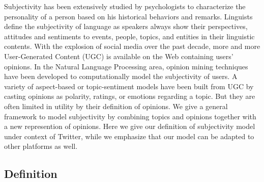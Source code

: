 \documentclass[letterpaper]{article}
\begin{document}
Subjectivity has been extensively studied by psychologists to characterize the personality of a person based on his historical behaviors and remarks\cite{engbert2007agency}. 
Linguists define the subjectivity of language as speakers always show their perspectives, attitudes and sentiments to events, people, topics, and entities in their linguistic contents\cite{stein2005subjectivity}. 
With the explosion of social media over the past decade, more and more User-Generated Content (UGC) is available on the Web containing users' opinions.
In the Natural Language Processing area, opinion mining techniques\cite{liu2012sentiment} have been developed to computationally model the subjectivity of users. A variety of aspect-based or topic-sentiment models have been built from UGC by casting opinions as polarity, ratings, or emotions regarding a topic\cite{lek2013aspect,mei2007topic}. But they are often limited in utility by their definition of opinions. We give a general framework to model subjectivity by combining topics and opinions together with a new represention of opinions. Here we give our definition of subjectivity model under context of Twitter, while we emphasize that our model can be adapted to other platforms as well.

\subsection{Definition}
\label{definition}
\end{document}
